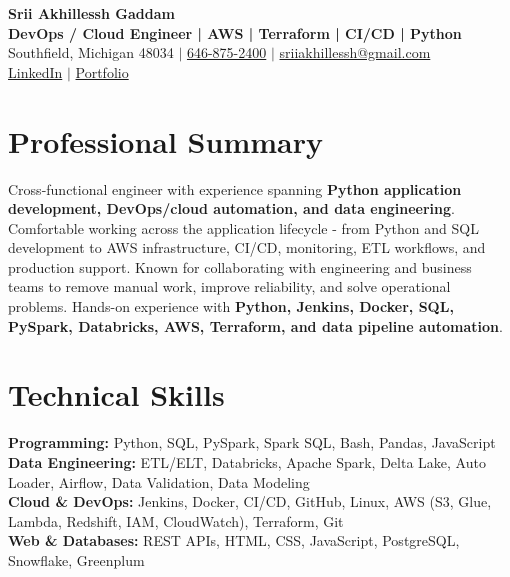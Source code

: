 \documentclass[letterpaper,10pt]{article}
\begin{document}
\fontsize{9.35pt}{10.45pt}\selectfont

\begin{center}
    {\LARGE \textbf{Srii Akhillessh Gaddam}} \\[-1pt]
    \textbf{DevOps / Cloud Engineer | AWS | Terraform | CI/CD | Python} \\[2pt]
    Southfield, Michigan 48034 $|$
    \href{tel:6468752400}{646-875-2400} $|$
    \href{mailto:sriiakhillessh@gmail.com}{sriiakhillessh@gmail.com} \\[1pt]
    \href{https://www.linkedin.com/in/srii-akhiilessh-gaddam-b48668191/}{LinkedIn} $|$
    \href{https://sriiakhillesshg.github.io/portfolio/}{Portfolio}
\end{center}
\vspace{-8pt}

\section{Professional Summary}
\small{Cross-functional engineer with experience spanning \textbf{Python application development, DevOps/cloud automation, and data engineering}. Comfortable working across the application lifecycle - from Python and SQL development to AWS infrastructure, CI/CD, monitoring, ETL workflows, and production support. Known for collaborating with engineering and business teams to remove manual work, improve reliability, and solve operational problems. Hands-on experience with \textbf{Python, Jenkins, Docker, SQL, PySpark, Databricks, AWS, Terraform, and data pipeline automation}.}

\section{Technical Skills}
\small{
\textbf{Programming:} Python, SQL, PySpark, Spark SQL, Bash, Pandas, JavaScript \\
\textbf{Data Engineering:} ETL/ELT, Databricks, Apache Spark, Delta Lake, Auto Loader, Airflow, Data Validation, Data Modeling \\
\textbf{Cloud \& DevOps:} Jenkins, Docker, CI/CD, GitHub, Linux, AWS (S3, Glue, Lambda, Redshift, IAM, CloudWatch), Terraform, Git \\
\textbf{Web \& Databases:} REST APIs, HTML, CSS, JavaScript, PostgreSQL, Snowflake, Greenplum
}
\end{document}
